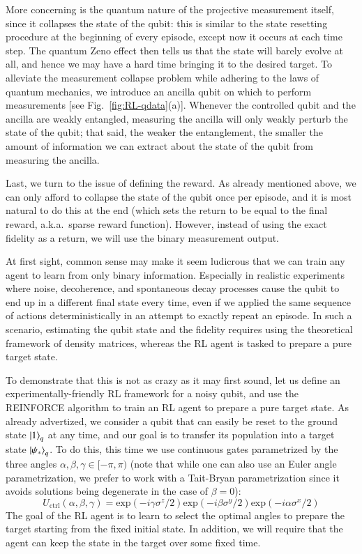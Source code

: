 More concerning is the quantum nature of the projective measurement itself, since it collapses the state of the qubit: this is similar to the state resetting procedure at the beginning of every episode, except now it occurs at each time step. The quantum Zeno effect then tells us that the state will barely evolve at all, and hence we may have a hard time bringing it to the desired target. To alleviate the measurement collapse problem while adhering to the laws of quantum mechanics, we introduce an ancilla qubit on which to perform measurements [see Fig.~\ref{fig:RL-qdata}(a)]. Whenever the controlled qubit and the ancilla are weakly entangled, measuring the ancilla will only weakly perturb the state of the qubit; that said, the weaker the entanglement, the smaller the amount of information we can extract about the state of the qubit from measuring the ancilla.  

Last, we turn to the issue of defining the reward. As already mentioned above, we can only afford to collapse the state of the qubit once per episode, and it is most natural to do this at the end (which sets the return to be equal to the final reward, a.k.a.~sparse reward function). However, instead of using the exact fidelity as a return, we will use the binary measurement output. 

At first sight, common sense may make it seem ludicrous that we can train any agent to learn from only binary information. Especially in realistic experiments where noise, decoherence, and spontaneous decay processes cause the qubit to end up in a different final state every time, even if we applied the same sequence of actions deterministically in an attempt to exactly repeat an episode. In such a scenario, estimating the qubit state and the fidelity requires using the theoretical framework of density matrices, whereas the RL agent is tasked to prepare a pure target state. 

To demonstrate that this is not as crazy as it may first sound, let us define an experimentally-friendly RL framework for a noisy qubit, and use the REINFORCE algorithm to train an RL agent to prepare a pure target state. As already advertized, we consider a qubit that can easily be reset to the ground state $\ket{1}_q$ at any time, and our goal is to transfer its population into a target state $\ket{\psi_\ast}_q$. To do this, this time we use continuous gates parametrized by the three angles $\alpha,\beta,\gamma\in[-\pi,\pi)$ (note that while one can also use an Euler angle parametrization, we prefer to work with a Tait-Bryan parametrization since it avoids solutions being degenerate in the case of $\beta=0$):
\begin{equation}
\label{eq:RL_ctrl_U}
    U_\text{ctrl}(\alpha,\beta,\gamma)= \mathrm{exp}(-i\gamma \sigma^z/2) \mathrm{exp}(-i\beta \sigma^y/2) \mathrm{exp}(-i\alpha \sigma^x/2)
\end{equation}
The goal of the RL agent is to learn to select the optimal angles to prepare the target starting from the fixed initial state. In addition, we will require that the agent can keep the state in the target over some fixed time.  

